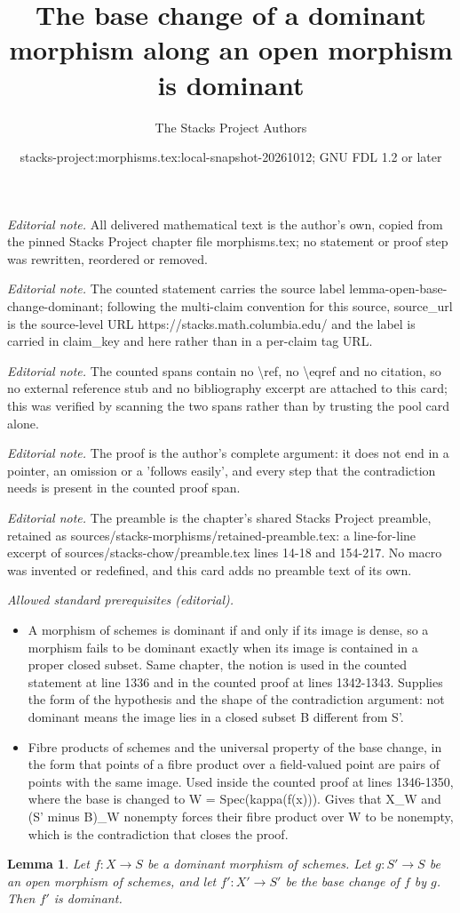 \documentclass[10pt,a4paper]{amsart}
\title{The base change of a dominant morphism along an open morphism is dominant}
\author{The Stacks Project Authors}
\date{stacks-project:morphisms.tex:local-snapshot-20261012; GNU FDL 1.2 or later}
\theoremstyle{plain}
\newtheorem{lemma}[subsection]{Lemma}
\theoremstyle{definition}
\theoremstyle{remark}
\numberwithin{equation}{subsection}
\begin{document}
\maketitle
\noindent\textit{Editorial note.} All delivered mathematical text is the author's own, copied from the pinned Stacks Project chapter file morphisms.tex; no statement or proof step was rewritten, reordered or removed.\par\medskip
\noindent\textit{Editorial note.} The counted statement carries the source label lemma-open-base-change-dominant; following the multi-claim convention for this source, source\_url is the source-level URL https://stacks.math.columbia.edu/ and the label is carried in claim\_key and here rather than in a per-claim tag URL.\par\medskip
\noindent\textit{Editorial note.} The counted spans contain no \textbackslash{}ref, no \textbackslash{}eqref and no citation, so no external reference stub and no bibliography excerpt are attached to this card; this was verified by scanning the two spans rather than by trusting the pool card alone.\par\medskip
\noindent\textit{Editorial note.} The proof is the author's complete argument: it does not end in a pointer, an omission or a 'follows easily', and every step that the contradiction needs is present in the counted proof span.\par\medskip
\noindent\textit{Editorial note.} The preamble is the chapter's shared Stacks Project preamble, retained as sources/stacks-morphisms/retained-preamble.tex: a line-for-line excerpt of sources/stacks-chow/preamble.tex lines 14-18 and 154-217. No macro was invented or redefined, and this card adds no preamble text of its own.\par\medskip
\noindent\textit{Allowed standard prerequisites (editorial).}\begin{itemize}
\item A morphism of schemes is dominant if and only if its image is dense, so a morphism fails to be dominant exactly when its image is contained in a proper closed subset. Same chapter, the notion is used in the counted statement at line 1336 and in the counted proof at lines 1342-1343. Supplies the form of the hypothesis and the shape of the contradiction argument: not dominant means the image lies in a closed subset B different from S'.
\item Fibre products of schemes and the universal property of the base change, in the form that points of a fibre product over a field-valued point are pairs of points with the same image. Used inside the counted proof at lines 1346-1350, where the base is changed to W = Spec(kappa(f(x))). Gives that X\_W and (S' minus B)\_W nonempty forces their fibre product over W to be nonempty, which is the contradiction that closes the proof.
\end{itemize}\medskip
\begin{lemma}
\label{lemma-open-base-change-dominant}
Let $f : X \to S$ be a dominant morphism of schemes.
Let $g : S' \to S$ be an open morphism of schemes, and let $f' : X' \to S'$
be the base change of $f$ by $g$. Then $f'$ is dominant.
\end{lemma}
\end{document}
